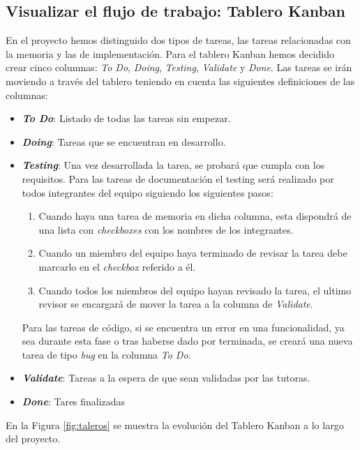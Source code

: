 \subsection{Visualizar el flujo de trabajo: Tablero Kanban}\label{sec:flujoTrabajo}
En el proyecto hemos distinguido dos tipos de tareas, las tareas relacionadas con la memoria y las de implementación. Para el tablero Kanban hemos decidido crear cinco columnas: \textit{To Do}, \textit{Doing}, \textit{Testing}, \textit{Validate} y \textit{Done}.  Las tareas se irán moviendo a través del tablero teniendo en cuenta las siguientes definiciones de las columnas:
\begin{itemize}
  \item \textbf{\textit{To Do}}: Listado de todas las tareas sin empezar.
  \item \textbf{\textit{Doing}}: Tareas que se encuentran en desarrollo.
  \item \textbf{\textit{Testing}}: Una vez desarrollada la tarea, se probará que cumpla con los requisitos.
        Para las tareas de documentación el testing será realizado por todos integrantes del equipo siguiendo los siguientes pasos:
        \begin{enumerate}
          \item Cuando haya una tarea de memoria en dicha columna, esta dispondrá de una lista con \textit{checkboxes} con los nombres de los integrantes.
          \item Cuando un miembro del equipo haya terminado de revisar la tarea debe marcarlo en el \textit{checkbox} referido a él.
          \item Cuando todos los miembros del equipo hayan revisado la tarea, el ultimo revisor se encargará de mover la tarea a la columna de \textit{Validate}.
        \end{enumerate}
        Para las tareas de código, si se encuentra un error en una funcionalidad, ya sea durante esta fase o tras haberse dado por terminada, se creará una nueva tarea de tipo \textit{bug} en la columna \textit{To Do}.
  \item \textbf{\textit{Validate}}: Tareas a la espera de que sean validadas por las tutoras.
  \item \textbf{\textit{Done}}: Tares finalizadas
\end{itemize}
En la Figura \ref{fig:taleros} se muestra la evolución del Tablero Kanban a lo largo del proyecto.
